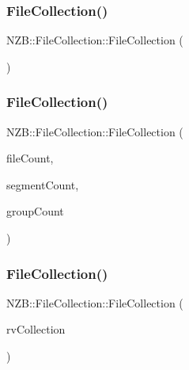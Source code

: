\subsubsection{\texorpdfstring{File\+Collection()}{FileCollection()}\hspace{0.1cm}{\footnotesize\ttfamily [1/4]}}
{\footnotesize\ttfamily N\+Z\+B\+::\+File\+Collection\+::\+File\+Collection (\begin{DoxyParamCaption}{ }\end{DoxyParamCaption})\hspace{0.3cm}{\ttfamily [inline]}}

\hypertarget{class_n_z_b_1_1_file_collection_a76662806b20ecb79fb1c4800df2ee9df}{}\label{class_n_z_b_1_1_file_collection_a76662806b20ecb79fb1c4800df2ee9df} 
\subsubsection{\texorpdfstring{File\+Collection()}{FileCollection()}\hspace{0.1cm}{\footnotesize\ttfamily [2/4]}}
{\footnotesize\ttfamily N\+Z\+B\+::\+File\+Collection\+::\+File\+Collection (\begin{DoxyParamCaption}\item[{int}]{file\+Count,  }\item[{int}]{segment\+Count,  }\item[{int}]{group\+Count }\end{DoxyParamCaption})}

\hypertarget{class_n_z_b_1_1_file_collection_ab14971382a51c26233307404bacfa8e6}{}\label{class_n_z_b_1_1_file_collection_ab14971382a51c26233307404bacfa8e6} 
\subsubsection{\texorpdfstring{File\+Collection()}{FileCollection()}\hspace{0.1cm}{\footnotesize\ttfamily [3/4]}}
{\footnotesize\ttfamily N\+Z\+B\+::\+File\+Collection\+::\+File\+Collection (\begin{DoxyParamCaption}\item[{\hyperlink{class_n_z_b_1_1_file_collection}{File\+Collection} \&\&}]{rv\+Collection }\end{DoxyParamCaption})}

